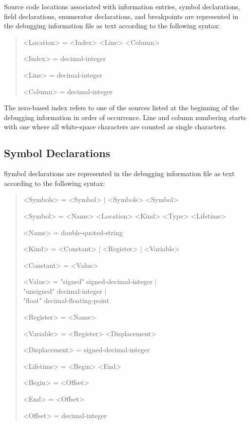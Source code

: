 Source code locations associated with information entries, symbol declarations, field declarations, enumerator declarations, and breakpoints are represented in the debugging information file as text according to the following syntax:

\begin{quote}\begin{grammar}
<Location> = <Index> <Line> <Column> \par
<Index> = decimal-integer \par
<Line> = decimal-integer \par
<Column> = decimal-integer \par
\end{grammar}\end{quote}

The zero-based index refers to one of the sources listed at the beginning of the debugging information in order of occurrence.
Line and column numbering starts with one where all white-space characters are counted as single characters.

\subsection{Symbol Declarations}

Symbol declarations are represented in the debugging information file as text according to the following syntax:

\begin{quote}\begin{grammar}
<Symbols> = <Symbol> $\mid$ <Symbols> <Symbol> \par
<Symbol> = <Name> <Location> <Kind> <Type> <Lifetime> \par
<Name> = double-quoted-string \par
<Kind> = <Constant> $\mid$ <Register> $\mid$ <Variable> \par
<Constant> = <Value> \par
<Value> = "signed" signed-decimal-integer $\mid$ \\ "unsigned" decimal-integer $\mid$ \\ "float" decimal-floating-point \par
<Register> = <Name> \par
<Variable> = <Register> <Displacement> \par
<Displacement> = signed-decimal-integer \par
<Lifetime> = <Begin> <End> \par
<Begin> = <Offset> \par
<End> = <Offset> \par
<Offset> = decimal-integer \par
\end{grammar}\end{quote}

